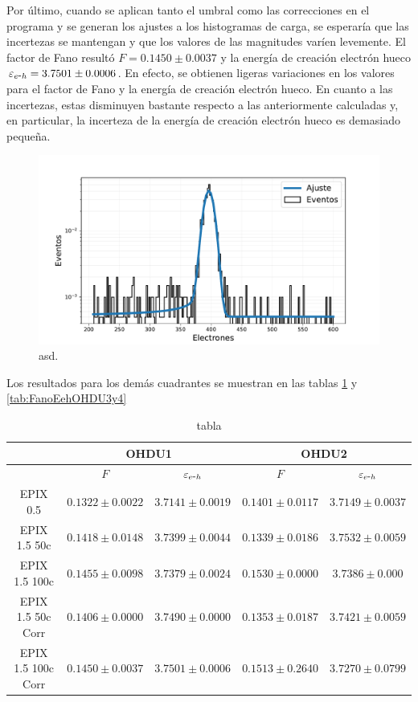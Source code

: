 Por último, cuando se aplican tanto el umbral como las correcciones en el programa y se generan los ajustes a los histogramas de carga, se esperaría que las incertezas se mantengan y que los valores de las magnitudes varíen levemente. El factor de Fano resultó $F = 0.1450 \pm 0.0037$ y la energía de creación electrón hueco $\varepsilon_{e\mbox{-}h} = 3.7501 \pm 0.0006$. En efecto, se obtienen ligeras variaciones en los valores para el factor de Fano y la energía de creación electrón hueco. En cuanto a las incertezas, estas disminuyen bastante respecto a las anteriormente calculadas y, en particular, la incerteza de la energía de creación electrón hueco es demasiado pequeña.
\begin{figure}[H]
    \centering
        \includegraphics[scale=0.5]{Figs/HistFit_100c_EPIX15_OHDU1_Corr.pdf}
    \caption{\footnotesize{asd.}}
    \label{fig:Al_OHDU1_EPIX15_Corr}
\end{figure}
Los resultados para los demás cuadrantes se muestran en las tablas \ref{tab:FanoEehOHDU1y2} y \ref{tab:FanoEehOHDU3y4}
\begin{table}[H]
\centering
\begin{tabular}{@{}ccccc@{}}
\toprule
                & \multicolumn{2}{c}{OHDU1}                 & \multicolumn{2}{c}{OHDU2}                 \\ \hline\hline
                & $F$                 & $\varepsilon_{e\mbox{-}h}$ & $F$                 & $\varepsilon_{e\mbox{-}h}$ \\
EPIX 0.5 & $0.1322 \pm 0.0022$ & $3.7141 \pm 0.0019$ & $0.1401 \pm 0.0117$ & $3.7149 \pm 0.0037$ \\ \hline
EPIX 1.5 50c & $0.1418 \pm 0.0148$ & $3.7399 \pm 0.0044$ & $0.1339 \pm 0.0186$ & $3.7532 \pm 0.0059$ \\
EPIX 1.5 100c & $0.1455 \pm 0.0098$ & $3.7379 \pm 0.0024$ & $0.1530 \pm 0.0000$ & $3.7386 \pm 0.000$ \\ \hline
EPIX 1.5 50c Corr & $0.1406 \pm 0.0000$ & $3.7490 \pm 0.0000$ & $0.1353 \pm 0.0187$ & $3.7421 \pm 0.0059$ \\
EPIX 1.5 100c Corr & $0.1450 \pm 0.0037$ & $3.7501 \pm 0.0006$ & $0.1513 \pm 0.2640$ & $3.7270 \pm 0.0799$ \\ \bottomrule \hline
\end{tabular}
\caption{tabla}
\label{tab:FanoEehOHDU1y2}
\end{table}
